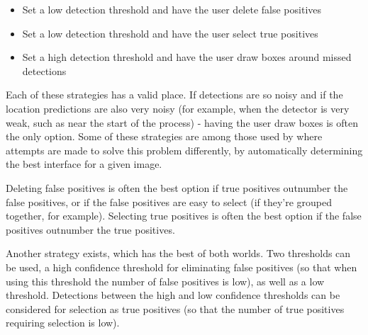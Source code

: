 \begin{itemize}
    \item Set a low detection threshold and have the user delete false positives
    \item Set a low detection threshold and have the user select true positives
    \item Set a high detection threshold and have the user draw boxes around missed detections
\end{itemize}

Each of these strategies has a valid place. If detections are so noisy and if the location predictions are also very noisy (for example, when the detector is very weak, such as near the start of the process) - having the user draw boxes is often the only option. Some of these strategies are among those used by \cite{Konyushkova2017} where attempts are made to solve this problem differently, by automatically determining the best interface for a given image.

Deleting false positives is often the best option if true positives outnumber the false positives, or if the false positives are easy to select (if they're grouped together, for example). Selecting true positives is often the best option if the false positives outnumber the true positives. 

Another strategy exists, which has the best of both worlds. Two thresholds can be used, a high confidence threshold for eliminating false positives (so that when using this threshold the number of false positives is low), as well as a low threshold. Detections between the high and low confidence thresholds can be considered for selection as true positives (so that the number of true positives requiring selection is low).


